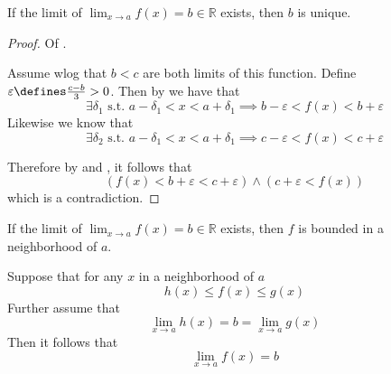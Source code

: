 \begin{thm}\label{thm-unique-limit}
	If the limit of $\displaystyle\lim_{x\to a}f(x)=b\in\mathbb{R}$ exists, then $b$ is unique.
\end{thm}

\begin{proof}
	Of .
	\begin{flushleft}
		Assume \gls{wlog} that $b<c$ are both limits of this function. Define
		$\varepsilon\defines\tfrac{c-b}{3}>0$. Then by
		 we have that
		\begin{equation}\label{eq-unique-limit:1}
			\exists\delta_1\text{ s.t. }a-\delta_1<x<a+\delta_1 \implies b-\varepsilon<f(x)<b+\varepsilon
		\end{equation}
		Likewise we know that
		\begin{equation}\label{eq-unique-limit:2}
			\exists\delta_2\text{ s.t. }a-\delta_1<x<a+\delta_1 \implies c-\varepsilon<f(x)<c+\varepsilon
		\end{equation}
	\end{flushleft}
	Therefore by  and ,
	it follows that
	\begin{equation*}
		\left(f(x)<b+\varepsilon<c+\varepsilon\right)\land\left(c+\varepsilon<f(x)\right)
	\end{equation*}
	which is a contradiction.
\end{proof}

\begin{thm}\label{def-limit-is-bounded}
	If the limit of $\displaystyle\lim_{x\to a}f(x)=b\in\mathbb{R}$ exists, then
	$f$ is bounded in a neighborhood of $a$.
\end{thm}

\begin{thm}\label{thm-sandwich-theorem}
	Suppose that for any $x$ in a neighborhood of $a$
	\begin{equation*}
		h(x) \leq f(x) \leq g(x)
	\end{equation*}
	Further assume that
	\begin{equation*}
		\lim_{x \to a}h(x) = b = \lim_{x \to a}g(x)
	\end{equation*}
	Then it follows that
	\begin{equation*}
		\lim_{x \to a}f(x) = b
	\end{equation*}
\end{thm}


